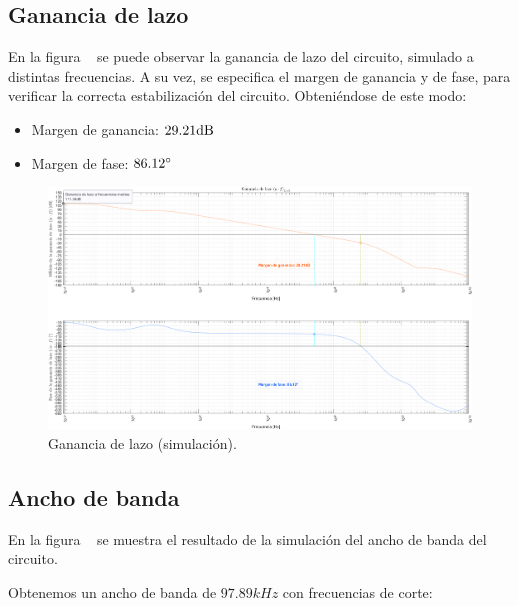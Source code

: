 \clearpage

\subsection{Ganancia de lazo}

\par En la figura ~ se puede observar la ganancia de lazo del circuito, simulado a distintas frecuencias. A su vez, se especifica el margen de ganancia y de fase, para verificar la correcta estabilización del circuito. Obteniéndose de este modo:

\begin{itemize}
    \item Margen de ganancia: $29.21 \si[per-mode=symbol]{\decibel}$
    \item Margen de fase: $86.12 \si[per-mode=symbol]{\degree}$
\end{itemize}

\vfill

\clearpage

\begin{figure}[H]
    \centering
    \includegraphics[height=0.66 \textwidth, angle=90]{./img/simulaciones/Loop/gain_loop.png}
    \caption{Ganancia de lazo (simulación).}
    \label{fig:gain_loop_sim}
\end{figure}

\clearpage

\subsection{Ancho de banda}

\par En la figura ~ se muestra el resultado de la simulación del ancho de banda del circuito.
\par Obtenemos un ancho de banda de $97.89kHz$ con frecuencias de corte:


